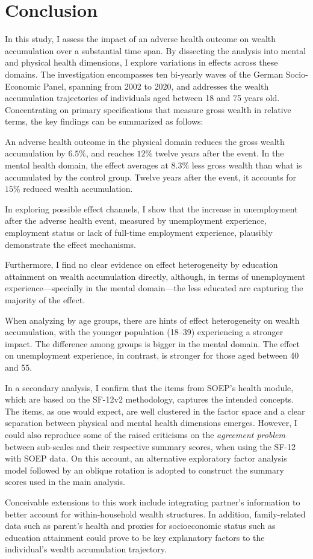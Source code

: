 \chapter{Conclusion}
\label{ch:conclus}

In this study, I assess the impact of an adverse health outcome on wealth accumulation over a substantial time
span. By dissecting the analysis into mental and physical health dimensions, I explore variations in effects
across these domains. The investigation encompasses ten bi-yearly waves of the German Socio-Economic Panel,
spanning from 2002 to 2020, and addresses the wealth accumulation trajectories of individuals aged between 18
and 75 years old. Concentrating on primary specifications that measure gross wealth in relative terms, the key
findings can be summarized as follows:

An adverse health outcome in the physical domain reduces the gross wealth accumulation by $6.5\%$,
and reaches $12\%$ twelve years after the event. %
%
In the mental health domain, the effect averages at $8.3\%$ less gross wealth than what is accumulated by the
control group. Twelve years after the event, it accounts for $15\%$ reduced wealth accumulation.

In exploring possible effect channels, I show that the increase in unemployment after the adverse health 
event, measured by unemployment experience, employment status or lack of full-time employment experience,
plausibly demonstrate the effect mechanisms. 

Furthermore, I find no clear evidence on effect heterogeneity by education attainment on  wealth
accumulation directly, although, in terms of unemployment experience---specially in the mental domain---the less
educated are capturing the majority of the effect.

When analyzing by age groups, there are hints of effect heterogeneity on wealth accumulation, with the younger
population (18--39) experiencing a stronger impact. The difference among groups is bigger in the mental
domain. The effect on unemployment experience, in contrast, is stronger for those aged between 40 and 55.


In a secondary analysis, I confirm that the items from SOEP's health module, which are based on the SF-12v2
methodology, captures the intended concepts. The items, as one would expect, are well clustered in the factor space
and a clear separation between physical and mental health dimensions emerges. However, I could also reproduce some
of the raised criticisms on the \textit{agreement problem} between sub-scales and their respective summary scores,
when using the SF-12 with SOEP data. On this account, an alternative exploratory factor analysis model followed by
an oblique rotation is adopted to construct the summary scores used in the main analysis.

Conceivable extensions to this work include integrating partner's information to better account for within-household wealth
structures. In addition, family-related data such as parent's health and proxies for socioeconomic status such
as education attainment could prove to be key explanatory factors to the individual's wealth accumulation
trajectory. 

